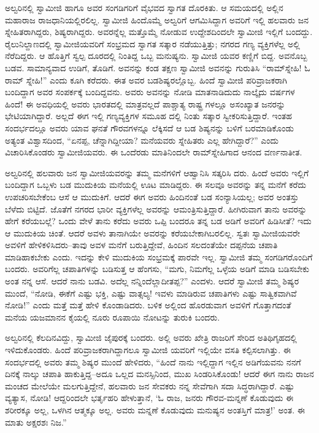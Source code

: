 ಅಲ್ವರಿನಲ್ಲಿ ಸ್ವಾಮೀಜಿ ಹಾಗೂ ಅವರ ಸಂಗಡಿಗರಿಗೆ ವೈಭವದ ಸ್ವಾಗತ ದೊರಕಿತು. ಆ ಸಮಯದಲ್ಲಿ ಅಲ್ಲಿನ ಮಹಾರಾಜ ರಾಜಧಾನಿಯಲ್ಲಿರಲಿಲ್ಲ. ಸ್ವಾಮೀಜಿ ಹಿಂದೊಮ್ಮೆ ಅಲ್ವರಿಗೆ ಆಗಮಿಸಿದ್ದಾಗ ಅವರಿಗೆ ಇಲ್ಲಿ ಹಲವಾರು ಜನ ಸ್ನೇಹಿತರಾಗಿದ್ದರು, ಶಿಷ್ಯರಾಗಿದ್ದರು. ಅವರನ್ನೆಲ್ಲ ಮತ್ತೊಮ್ಮೆ ನೋಡುವ ಉದ್ದೇಶದಿಂದಲೇ ಸ್ವಾಮೀಜಿ ಇಲ್ಲಿಗೆ ಬಂದದ್ದು. ರೈಲುನಿಲ್ದಾಣದಲ್ಲಿ ಸ್ವಾಮೀಜಿಯವರಿಗೆ ಸಂಭ್ರಮದ ಸ್ವಾಗತ ಸತ್ಕಾರ ನಡೆಯುತ್ತಿತ್ತು; ನಗರದ ಗಣ್ಯ ವ್ಯಕ್ತಿಗಳೆಲ್ಲ ಅಲ್ಲಿ ನೆರೆದಿದ್ದರು. ಆ ಹೊತ್ತಿಗೆ ಸ್ವಲ್ಪ ದೂರದಲ್ಲಿ ನಿಂತಿದ್ದ ಒಬ್ಬ ಮನುಷ್ಯನು. ಸ್ವಾಮೀಜಿ ಯವರ ಕಣ್ಣಿಗೆ ಬಿದ್ದ. ಅವನೊಬ್ಬ ಬಡವ. ಸಾಮಾನ್ಯವಾದ ಉಡಿಗೆ, ತೊಡಿಗೆ. ಅವನನ್ನು ಕಂಡ ತಕ್ಷಣ ಸ್ವಾಮೀಜಿ ಅವನನ್ನು ಗುರುತಿಸಿ “ರಾಮ್​ಸ್ನೇಹಿ! ಓ ರಾಮ್ ಸ್ನೇಹಿ!” ಎಂದು ಕೂಗಿ ಕರೆದರು. ಈತ ಅವರ ಬಡಶಿಷ್ಯರಲ್ಲೊಬ್ಬ. ಹಿಂದೆ ಸ್ವಾಮೀಜಿ ಪರಿವ್ರಾಜಕರಾಗಿ ಬಂದಿದ್ದಾಗ ಅವರ ಸಂಪರ್ಕಕ್ಕೆ ಬಂದಿದ್ದವನು. ಅವರು ಅವನನ್ನು ನೋಡಿ ಮಾತನಾಡಿದುದು ನಾಲ್ಕೈದು ವರ್ಷಗಳ ಹಿಂದೆ! ಈ ಅವಧಿಯಲ್ಲಿ ಅವರು ಭಾರತದಲ್ಲಿ ಮಾತ್ರವಲ್ಲದೆ ಪಾಶ್ಚಾತ್ಯ ರಾಷ್ಟ್ರ ಗಳಲ್ಲೂ ಅಸಂಖ್ಯಾತ ಜನರನ್ನು ಭೇಟಿಯಾಗಿದ್ದಾರೆ. ಅಲ್ಲದೆ ಈಗ ಇಲ್ಲಿ ಗಣ್ಯವ್ಯಕ್ತಿಗಳ ಸಮೂಹ ದಲ್ಲಿ ನಿಂತು ಸತ್ಕಾರ ಸ್ವೀಕರಿಸುತ್ತಿದ್ದಾರೆ. ಇಂತಹ ಸಂದರ್ಭದಲ್ಲೂ ಅವರು ಯಾವ ಘನತೆ ಗೌರವಗಳನ್ನೂ ಲೆಕ್ಕಿಸದೆ ಆ ಬಡ ಶಿಷ್ಯನನ್ನು ಬಳಿಗೆ ಬರಮಾಡಿಕೊಂಡು ಅತ್ಯಂತ ವಿಶ್ವಾಸದಿಂದ, “ಏನಪ್ಪ, ಚೆನ್ನಾಗಿದ್ದೀಯಾ? ಮನೆಯವರು ಸ್ನೇಹಿತರು ಎಲ್ಲ ಹೇಗಿದ್ದಾರೆ?” ಎಂದು ವಿಚಾರಿಸಿಕೊಂಡರು ಸ್ವಾಮೀಜಿಯವರು. ಈ ಒಂದೆರಡು ಮಾತಿನಿಂದಲೇ ರಾಮ್​ಸ್ನೇಹಿಗಾದ ಆನಂದ ವರ್ಣನಾತೀತ.

ಅಲ್ವರಿನಲ್ಲಿ ಹಲವಾರು ಜನ ಸ್ವಾಮೀಜಿಯವರನ್ನು ತಮ್ಮ ಮನೆಗಳಿಗೆ ಆಹ್ವಾನಿಸಿ ಸತ್ಕರಿಸಿ ದರು. ಹಿಂದೆ ಅವರು ಇಲ್ಲಿಗೆ ಬಂದಿದ್ದಾಗ ಒಬ್ಬಳು ಬಡ ಮುದುಕಿಯ ಮನೆಯಲ್ಲಿ ಊಟ ಮಾಡಿದ್ದರು. ಈ ಸಲವೂ ಅವರನ್ನು ತನ್ನ ಮನೆಗೆ ಕರೆದು ಉಪಚರಿಸಬೇಕೆಂಬ ಆಸೆ ಆ ಮುದುಕಿಗೆ. ಆದರೆ ಈಗ ಅವರು ಹಿಂದಿನಂತೆ ಬಡ ಸಂನ್ಯಾಸಿಯಲ್ಲ; ಅವರ ಅಂತಸ್ತು ಬೆಳೆದು ಬಿಟ್ಟಿದೆ. ಜೊತೆಗೆ ನಗರದ ಭಾರೀ ವ್ಯಕ್ತಿಗಳೆಲ್ಲ ಅವರನ್ನು ಆಮಂತ್ರಿಸುತ್ತಿದ್ದಾರೆ. ಹೀಗಿರುವಾಗ ತಾನು ಅವರನ್ನು ಹೇಗೆ ಕರೆಯಬಲ್ಲೆ? ಒಂದು ವೇಳೆ ತಾನು ಕರೆದು ಅವರು ಒಪ್ಪಿ ಬಂದರೂ ತನ್ನ ಬಡ ಅಡಿಗೆ ಅವರಿಗೆ ಹಿಡಿಸೀತೆ? ಇದು ಆ ಮುದುಕಿಯ ಚಿಂತೆ. ಆದರೆ ಅವಳು ತಾನಾಗಿಯೇ ಅವರನ್ನು ಕರೆಯಬೇಕಾಗಿಬರಲಿಲ್ಲ. ಸ್ವತಃ ಸ್ವಾಮೀಜಿಯವರೇ ಅವಳಿಗೆ ಹೇಳಿಕಳಿಸಿದರು–ತಾವು ಅವಳ ಮನೆಗೆ ಬರುತ್ತಿದ್ದೇವೆ, ಹಿಂದಿನ ಸಲದಂತೆಯೇ ದಪ್ಪನೆಯ ಚಪಾತಿ ಮಾಡಿಹಾಕಬೇಕು ಎಂದು. ಇದನ್ನು ಕೇಳಿ ಮುದುಕಿಯ ಸಂಭ್ರಮಕ್ಕೆ ಪಾರವೇ ಇಲ್ಲ. ಸ್ವಾಮೀಜಿ ತಮ್ಮ ಸಂಗಡಿಗರೊಂದಿಗೆ ಬಂದರು. ಅವರಿಗೆಲ್ಲ ಚಪಾತಿಗಳನ್ನು ಬಡಿಸುತ್ತ ಆ ಹೆಂಗಸು, “ಮಗು, ನಿಮಗೆಲ್ಲ ಒಳ್ಳೆಯ ಅಡಿಗೆ ಮಾಡಿ ಬಡಿಸಬೇಕು ಅಂತ ನನ್ನ ಆಸೆ. ಆದರೆ ನಾನು ಬಡವಿ. ಅದೆಲ್ಲ ನನ್ನಿಂದೆಲ್ಲಾದೀತಪ್ಪ?” ಎಂದಳು. ಆದರೆ ಸ್ವಾಮೀಜಿ ತಮ್ಮ ಶಿಷ್ಯರ ಮುಂದೆ, “ನೋಡಿ, ಈಕೆಗೆ ಎಷ್ಟು ಭಕ್ತಿ, ಎಷ್ಟು ವಾತ್ಸಲ್ಯ! ಇವಳು ಮಾಡಿರುವ ಚಪಾತಿಗಳು ಎಷ್ಟು ಸಾತ್ವಿಕವಾಗಿವೆ ನೋಡಿ!” ಎಂದು ಮತ್ತೆ ಮತ್ತೆ ಹೇಳಿ ಕೊಂಡಾಡಿದರು. ಬಳಿಕ ಅಲ್ಲಿಂದ ಹೊರಡುವಾಗ ಅವಳಿಗೆ ಗೊತ್ತಾಗದಂತೆ ಮನೆಯ ಯಜಮಾನನ ಕೈಯಲ್ಲಿ ನೂರು ರೂಪಾಯಿ ನೋಟನ್ನು ತುರುಕಿ ಬಂದರು.

ಅಲ್ವರಿನಲ್ಲಿ ಕೆಲದಿನವಿದ್ದು, ಸ್ವಾಮೀಜಿ ಜೈಪುರಕ್ಕೆ ಬಂದರು. ಅಲ್ಲಿ ಅವರು ಖೇತ್ರಿ ರಾಜರಿಗೆ ಸೇರಿದ ಅತಿಥಿಗೃಹದಲ್ಲಿ ಇಳಿದುಕೊಂಡರು. ಹಿಂದೆ ಪರಿವ್ರಾಜಕರಾಗಿದ್ದಾಗಲೂ ಸ್ವಾಮೀಜಿ ಯವರಿಗೆ ಇಲ್ಲಿಯೇ ವಸತಿ ಕಲ್ಪಿಸಲಾಗಿತ್ತು. ಈ ಸಂದರ್ಭದಲ್ಲಿ ಅವರು ತಮ್ಮ ಶಿಷ್ಯರ ಮುಂದೆ ಹೇಳಿದರು, “ಹಿಂದೆ ನಾನು ಇಲ್ಲಿದ್ದಾಗ ಇಲ್ಲಿನ ಅಡಿಗೆಯವನು ನನಗೆ ದಿನಕ್ಕೆ ನಾಲ್ಕು ಚಪಾತಿ ಹಾಕುತ್ತಿದ್ದ–ಅದೂ ಒಲ್ಲದ ಮನಸ್ಸಿನಿಂದ, ಮುಖ ಸಿಂಡರಿಸಿಕೊಂಡು! ಆದರೆ ಈಗ ನಾನು ರಾಜನ ಮಂಚದ ಮೇಲೆಯೇ ಮಲಗುತ್ತಿದ್ದೇನೆ, ಹಲವಾರು ಜನ ಸೇವಕರು ನನ್ನ ಸೇವೆಗಾಗಿ ಸದಾ ಸಿದ್ಧರಾಗಿದ್ದಾರೆ. ಎಷ್ಟು ವ್ಯತ್ಯಾಸ, ನೋಡಿ! ಆದ್ದರಿಂದಲೇ ಭರ್ತೃಹರಿ ಹೇಳುತ್ತಾನೆ, ‘ಓ ರಾಜ, ಜನರು ಗೌರವ-ಮನ್ನಣೆ ಕೊಡುವುದು ಈ ಶರೀರಕ್ಕೂ ಅಲ್ಲ, ಒಳಗಿನ ಆತ್ಮಕ್ಕೂ ಅಲ್ಲ. ಅವರು ಮನ್ನಣೆ ಕೊಡುವುದು ಮನುಷ್ಯನ ಅಂತಸ್ತಿಗೆ ಮಾತ್ರ!’ ಅಂತ. ಈ ಮಾತು ಅಕ್ಷರಶಃ ನಿಜ.”

